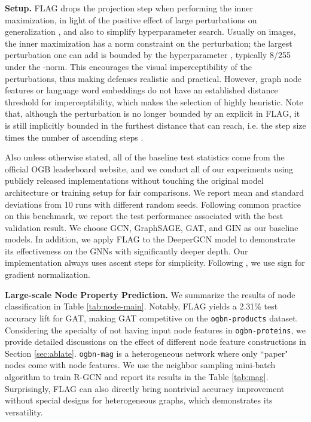 \documentclass[11pt]{article}
\begin{document}
{\bf Setup.}  FLAG drops the projection step when performing the inner maximization, in light of the positive effect of large perturbations on generalization \citep{volpi2018generalizing}, and also to simplify hyperparameter search. Usually on images, the inner maximization has a norm constraint on the perturbation; the largest perturbation one can add is bounded by the hyperparameter , typically 8/255 under the -norm. This  encourages the visual imperceptibility of the perturbations, thus making defenses realistic and practical. However, graph node features or language word embeddings do not have an established distance threshold for imperceptibility, which makes the selection of  highly heuristic. Note that, although the perturbation is no longer bounded by an explicit  in FLAG, it is still implicitly bounded in the furthest distance that  can reach, i.e. the step size  times the number of ascending steps . 


Also unless otherwise stated, all of the baseline test statistics come from the official OGB leaderboard website, and we conduct all of our experiments using publicly released implementations without touching the original model architecture or training setup for fair comparisons. We report mean and standard deviations from 10 runs with different random seeds. Following common practice on this benchmark, we report the test performance associated with the best validation result. We choose GCN, GraphSAGE, GAT, and GIN as our baseline models. In addition, we apply FLAG to the DeeperGCN model to demonstrate its effectiveness on the GNNs with significantly deeper depth. Our implementation always uses  ascent steps for simplicity. Following \citet{goodfellow2014explaining,madry2017towards}, we use sign for gradient normalization. 


{\bf Large-scale Node Property Prediction.} We summarize the results of node classification in Table \ref{tab:node-main}. Notably, FLAG yields a 2.31\% test accuracy lift for GAT, making GAT competitive on the \texttt{ogbn-products} dataset. Considering the specialty of not having input node features in \texttt{ogbn-proteins}, we provide detailed discussions on the effect of different node feature constructions in Section \ref{sec:ablate}. \texttt{ogbn-mag} is a heterogeneous network where only ``paper" nodes come with node features. We use the neighbor sampling mini-batch algorithm to train R-GCN and report its results in the Table \ref{tab:mag}. Surprisingly, FLAG can also directly bring nontrivial accuracy improvement without special designs for heterogeneous graphs, which demonstrates its versatility.   
\end{document}
